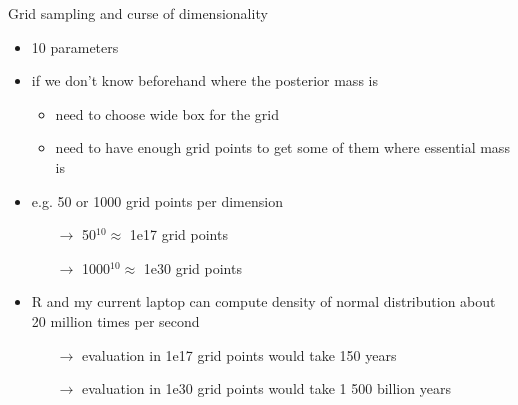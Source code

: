 \documentclass[finnish,english,t]{beamer}
\begin{document}
\begin{frame}{Grid sampling and curse of dimensionality}

  \begin{itemize}
      \item 10 parameters
      \item if we don't know beforehand where the posterior mass is
        \begin{itemize}
          \item need to choose wide box for the grid
          \item need to have enough grid points to get some of them
            where essential mass is
        \end{itemize}
      \item e.g. 50 or 1000 grid points per dimension
        \begin{itemize}
        \item[$\rightarrow$] 50$^{10} \approx$ 1e17 grid points
        \item[$\rightarrow$] 1000$^{10} \approx$ 1e30 grid points
        \end{itemize}
      \item R and my current laptop can compute density of normal
        distribution about 20 million times per second
        \begin{itemize}
        \item[$\rightarrow$] evaluation in 1e17 grid points would take
           150 years %
        \item[$\rightarrow$] evaluation in 1e30 grid points would take
           1 500 billion years %
        \end{itemize}
 \end{itemize}

\end{frame}
\end{document}
